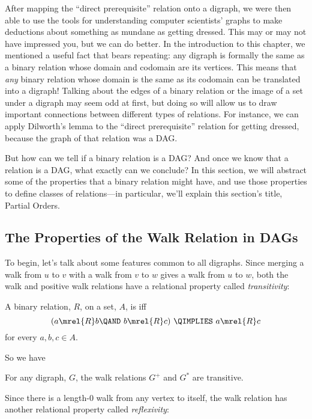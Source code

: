 After mapping the ``direct prerequisite'' relation onto a digraph, we
were then able to use the tools for understanding computer scientists'
graphs to make deductions about something as mundane as getting
dressed.  This may or may not have impressed you, but we can do
better.  In the introduction to this chapter, we mentioned a useful
fact that bears repeating: any digraph is formally the same as a
binary relation whose domain and codomain are its vertices.  This
means that \emph{any} binary relation whose domain is the same as its
codomain can be translated into a digraph!  Talking about the edges of
a binary relation or the image of a set under a digraph may seem odd
at first, but doing so will allow us to draw important connections
between different types of relations.  For instance, we can apply
Dilworth's lemma to the ``direct prerequisite'' relation for getting
dressed, because the graph of that relation was a DAG.

But how can we tell if a binary relation is a DAG?  And once we know
that a relation is a DAG, what exactly can we conclude?  In this
section, we will abstract some of the properties that a binary
relation might have, and use those properties to define classes of
relations---in particular, we'll explain this section's title, Partial
Orders.

\subsection{The Properties of the Walk Relation in DAGs}

To begin, let's talk about some features common to all digraphs.
Since merging a walk from $u$ to $v$ with a walk from $v$ to $w$ gives
a walk from $u$ to $w$, both the walk and positive walk relations have
a relational property called \emph{transitivity}:

\begin{definition}
A binary relation, $R$, on a set, $A$, is
 iff
\[
(a \mrel{R}  b \QAND\ b \mrel{R}  c)\ \QIMPLIES\  a \mrel{R}  c
\]
\quad for every $a,b,c\in A$.
\end{definition}
So we have
\begin{lemma}
For any digraph, $G$, the walk relations $G^+$ and $G^*$ are transitive.
\end{lemma}

Since there is a length-0 walk from any vertex to itself, the walk
relation has another relational property called \emph{reflexivity}:


